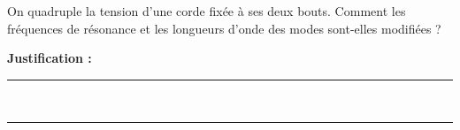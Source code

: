 On quadruple la tension d'une corde fixée à ses deux bouts. Comment les fréquences de résonance et les longueurs d'onde des modes sont-elles modifiées ?

\choices

\noindent\textbf{Justification :} \hrulefill \\[2.5ex]
\rule{\linewidth}{0.4pt} \\[2.5ex]
\rule{\linewidth}{0.4pt}
\vfill
